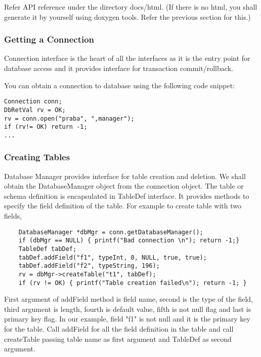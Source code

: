 \documentclass[12pt]{article}
\begin{document}
Refer API reference under the directory docs/html. (If there is no html, you shall generate it by yourself using doxygen tools. Refer the previous section for this.)

\subsubsection{Getting a Connection}
\label{getconn}
Connection interface is the heart of all the interfaces as it is the entry point for database access and it provides interface for transaction commit/rollback.

You can obtain a connection to database using the following code snippet:

\begin{verbatim}
Connection conn;
DbRetVal rv = OK;
rv = conn.open("praba", ",manager");
if (rv!= OK) return -1;
...
\end{verbatim}

\subsubsection{Creating Tables}
\label{createtable}
Database Manager provides interface for table creation and deletion. We shall obtain the DatabaseManager object from the connection object. The table or schema definition is encapsulated in TableDef interface. It provides methods to specify the field definition of the table.
For example to create table with two fields, 
\begin{verbatim}
    DatabaseManager *dbMgr = conn.getDatabaseManager();
    if (dbMgr == NULL) { printf("Bad connection \n"); return -1;}
    TableDef tabDef;
    tabDef.addField("f1", typeInt, 0, NULL, true, true);
    tabDef.addField("f2", typeString, 196);
    rv = dbMgr->createTable("t1", tabDef);
    if (rv != OK) { printf("Table creation failed\n"); return -1; }
\end{verbatim}

First argument of addField method is field name, second is the type of the field, third argument is length, fourth is default value, fifth is not null flag and last is primary key flag.
In our example, field "f1" is not null and it is the primary key for the table.
Call addField for all the field definition in the table and call createTable passing table name as first argument and TableDef as second argument.
\end{document}

